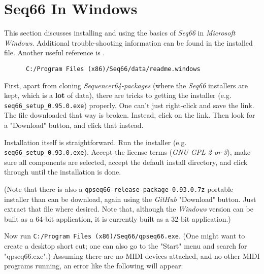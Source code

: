 %
%
%

\section{Seq66 In Windows}
\label{sec:windows}

   This section discusses installing and using the basics of \textsl{Seq66}
   in \textsl{Microsoft Windows}.  Additional trouble-shooting information can be
   found in the installed file.
   Another useful reference is \cite{windowsmidi}.

   \begin{verbatim}
      C:/Program Files (x86)/Seq66/data/readme.windows
   \end{verbatim}

   First, apart from cloning \textsl{Sequencer64-packages} (where the
   \textsl{Seq66} installers are kept, which is a \textbf{lot}
   of data), there are tricks to getting the installer
   (e.g. \texttt{seq66\_setup\_0.95.0.exe}) properly. 
   One can't just right-click and save the link.
   The file downloaded that way is broken.
   Instead, click on the link.  Then look for a "Download" button, and
   click that instead.

   Installation itself is straightforward.  Run the installer (e.g.
   \texttt{seq66\_setup\_0.93.0.exe}).  Accept the license terms (\textsl{GNU
   GPL 2 or 3}), make sure all components are selected, accept the default
   install directory, and click through until the installation is done.

   (Note that there is also a
   \texttt{qpseq66-release-package-0.93.0.7z} portable installer
   than can be download, again using the \textsl{GitHub} "Download" button.
   Just extract that file where desired.
   Note that, although the \textsl{Windows} version can be built as a 64-bit
   application, it is currently built as a 32-bit application.)

   Now run 
   \texttt{C:/Program Files (x86)/Seq66/qpseq66.exe}.
   (One might want to create a desktop short cut; one can also go to the
   "Start" menu and search for "qpseq66.exe".)
   Assuming there are no MIDI devices attached, and no other MIDI programs
   running, an error like the following will appear:

